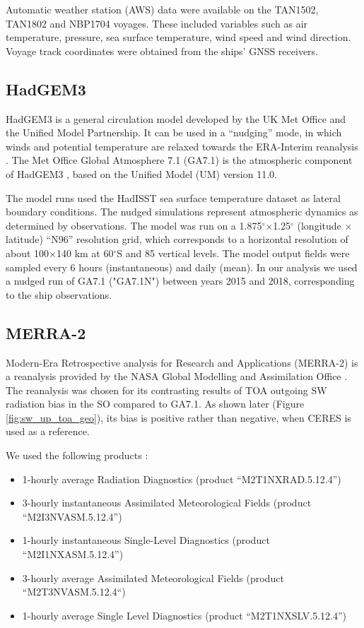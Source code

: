 Automatic weather station (AWS) data were available on the TAN1502, TAN1802 and
NBP1704 voyages. These included variables such as air temperature, pressure,
sea surface temperature, wind speed and wind direction. Voyage track
coordinates were obtained from the ships' GNSS receivers.

\subsection{HadGEM3}
\label{sec:hadgem3}
HadGEM3 \citep{walters2017} is a general circulation model developed by the UK
Met Office and the Unified Model Partnership.
It can be used in a ``nudging'' \citep{telford2008} mode, in which winds and
potential temperature are relaxed towards the ERA-Interim reanalysis
\citep{dee2011}. The Met Office Global Atmosphere 7.1 (GA7.1) is the atmospheric
component of HadGEM3 \citep{walters2017}, based on the Unified Model (UM)
version 11.0.

The model runs used the HadISST sea surface temperature dataset
\citep{rayner2003} as lateral boundary conditions. The nudged simulations
represent atmospheric dynamics as determined by observations. The model was run
on a 1.875$^\circ$$\times$1.25$^\circ$ (longitude $\times$ latitude) ``N96''
resolution grid, which corresponds to a horizontal resolution of about
100$\times$140 \unit{km} at 60$^\circ$S and 85 vertical levels. The model output
fields were sampled every 6 hours (instantaneous) and daily (mean). In our
analysis we used a nudged run of GA7.1 ("GA7.1N") between years 2015 and 2018,
corresponding to the ship observations.

\subsection{MERRA-2}
\label{sec:merra-2}

Modern-Era Retrospective analysis for Research and Applications (MERRA-2) is a
reanalysis provided by the NASA Global Modelling and Assimilation Office
\citep{gelaro2017}. The reanalysis was chosen for its contrasting results of
TOA outgoing SW radiation bias in the SO compared to GA7.1. As shown later
(Figure \ref{fig:sw_up_toa_geo}), its bias is positive rather than negative,
when CERES is used as a reference.

We used the following products \citep{bosilovich2015}:

\begin{itemize}
\item 1-hourly average Radiation Diagnostics (product ``M2T1NXRAD.5.12.4'')
\item 3-hourly instantaneous Assimilated Meteorological Fields (product
``M2I3NVASM.5.12.4'')
\item 1-hourly instantaneous Single-Level Diagnostics (product
``M2I1NXASM.5.12.4'')
\item 3-hourly average Assimilated Meteorological Fields (product
``M2T3NVASM.5.12.4``)
\item 1-hourly average Single Level Diagnostics (product ``M2T1NXSLV.5.12.4'')
\end{itemize}

